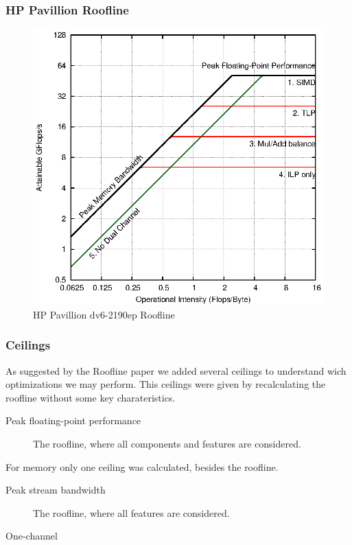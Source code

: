 \documentclass[a4paper,10pt,openright,openbib]{article}
\begin{document}
\subsubsection{HP Pavillion Roofline}
\begin{figure}[!htp]
	\centering
	\begin{minipage}[t]{0.5\linewidth}
		\includegraphics[width=\textwidth]{images/roofline_hp.eps}
		\caption{HP Pavillion dv6-2190ep Roofline \label{fig:roofline2}}
	\end{minipage}
\end{figure}

\subsubsection{Ceilings}
As suggested by the Roofline paper we added several ceilings to understand wich optimizations we may perform.
This ceilings were given by recalculating the roofline without some key charateristics.
\begin{description}
\item[Peak floating-point performance] The roofline, where all components and features are considered.
\item[]
\item[]
\item[]
\end{description}
For memory only one ceiling was calculated, besides the roofline.
\begin{description}
\item[Peak stream bandwidth] The roofline, where all features are considered.
\item[One-channel]
\end{description}
\end{document}

